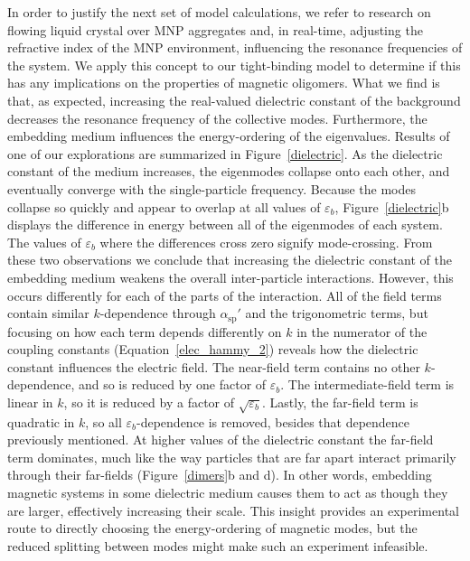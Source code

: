 \documentclass[journal=apchd5,manuscript=article]{achemso}
\begin{document}
In order to justify the next set of model calculations, we refer to research on flowing liquid crystal over MNP aggregates and, in real-time, adjusting the refractive index of the MNP environment, influencing the resonance frequencies of the system\cite{odom_lasing}. We apply this concept to our tight-binding model to determine if this has any implications on the properties of magnetic oligomers. What we find is that, as expected, increasing the real-valued dielectric constant of the background decreases the resonance frequency of the collective modes. Furthermore, the embedding medium influences the energy-ordering of the eigenvalues. Results of one of our explorations are summarized in Figure~\ref{dielectric}. As the dielectric constant of the medium increases, the eigenmodes collapse onto each other, and eventually converge with the single-particle frequency. Because the modes collapse so quickly and appear to overlap at all values of $\varepsilon_b$, Figure~\ref{dielectric}b displays the difference in energy between all of the eigenmodes of each system. The values of $\varepsilon_b$ where the differences cross zero signify mode-crossing. 
From these two observations we conclude that increasing the dielectric constant of the embedding medium weakens the overall inter-particle interactions. However, this occurs differently for each of the parts of the interaction. All of the field terms contain similar $k$-dependence through $\alpha_{\textrm{sp}}'$ and the trigonometric terms, but focusing on how each term depends differently on $k$ in the numerator of the coupling constants (Equation~\ref{elec_hammy_2}) reveals how the dielectric constant influences the electric field. The near-field term contains no other $k$-dependence, and so is reduced by one factor of $\varepsilon_b$. The intermediate-field term is linear in $k$, so it is reduced by a factor of $\sqrt{\varepsilon_b}$. Lastly, the far-field term is quadratic in $k$, so all $\varepsilon_b$-dependence is removed, besides that dependence previously mentioned. At higher values of the dielectric constant the far-field term dominates, much like the way particles that are far apart interact primarily through their far-fields (Figure~\ref{dimers}b and d). In other words, embedding magnetic systems in some dielectric medium causes them to act as though they are larger, effectively increasing their scale. This insight provides an experimental route to directly choosing the energy-ordering of magnetic modes, but the reduced splitting between modes might make such an experiment infeasible.
\end{document}
